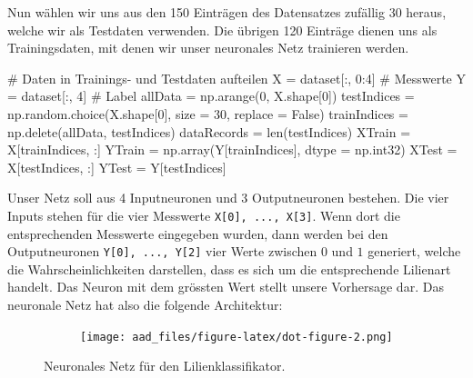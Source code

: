 \documentclass[
  a4paper,
  DIV=11]{scrreprt}
\newenvironment{Shaded}{\begin{snugshade}}{\end{snugshade}}
\newcommand{\BuiltInTok}[1]{\textcolor[rgb]{0.00,0.23,0.31}{#1}}
\newcommand{\CommentTok}[1]{\textcolor[rgb]{0.37,0.37,0.37}{#1}}
\newcommand{\DecValTok}[1]{\textcolor[rgb]{0.68,0.00,0.00}{#1}}
\newcommand{\NormalTok}[1]{\textcolor[rgb]{0.00,0.23,0.31}{#1}}
\newcommand{\OperatorTok}[1]{\textcolor[rgb]{0.37,0.37,0.37}{#1}}
\newcommand{\VariableTok}[1]{\textcolor[rgb]{0.07,0.07,0.07}{#1}}
\theoremstyle{definition}
\theoremstyle{definition}
\theoremstyle{remark}
\begin{document}
Nun wählen wir uns aus den 150 Einträgen des Datensatzes zufällig 30
heraus, welche wir als Testdaten verwenden. Die übrigen 120 Einträge
dienen uns als Trainingsdaten, mit denen wir unser neuronales Netz
trainieren werden.

\begin{Shaded}
\begin{Highlighting}[]
\CommentTok{\# Daten in Trainings{-} und Testdaten aufteilen}
\NormalTok{X }\OperatorTok{=}\NormalTok{ dataset[:, }\DecValTok{0}\NormalTok{:}\DecValTok{4}\NormalTok{] }\CommentTok{\# Messwerte}
\NormalTok{Y }\OperatorTok{=}\NormalTok{ dataset[:, }\DecValTok{4}\NormalTok{]   }\CommentTok{\# Label}
\NormalTok{allData }\OperatorTok{=}\NormalTok{ np.arange(}\DecValTok{0}\NormalTok{, X.shape[}\DecValTok{0}\NormalTok{])}
\NormalTok{testIndices }\OperatorTok{=}\NormalTok{ np.random.choice(X.shape[}\DecValTok{0}\NormalTok{], size }\OperatorTok{=} \DecValTok{30}\NormalTok{, replace }\OperatorTok{=} \VariableTok{False}\NormalTok{)}
\NormalTok{trainIndices }\OperatorTok{=}\NormalTok{ np.delete(allData, testIndices)}
\NormalTok{dataRecords }\OperatorTok{=} \BuiltInTok{len}\NormalTok{(testIndices)}
\NormalTok{XTrain }\OperatorTok{=}\NormalTok{ X[trainIndices, :]}
\NormalTok{YTrain }\OperatorTok{=}\NormalTok{ np.array(Y[trainIndices], dtype }\OperatorTok{=}\NormalTok{ np.int32)}
\NormalTok{XTest }\OperatorTok{=}\NormalTok{ X[testIndices, :]}
\NormalTok{YTest }\OperatorTok{=}\NormalTok{ Y[testIndices]}
\end{Highlighting}
\end{Shaded}

Unser Netz soll aus 4 Inputneuronen und 3 Outputneuronen bestehen. Die
vier Inputs stehen für die vier Messwerte
\texttt{X{[}0{]},\ ...,\ X{[}3{]}}. Wenn dort die entsprechenden
Messwerte eingegeben wurden, dann werden bei den Outputneuronen
\texttt{Y{[}0{]},\ ...,\ Y{[}2{]}} vier Werte zwischen \(0\) und \(1\)
generiert, welche die Wahrscheinlichkeiten darstellen, dass es sich um
die entsprechende Lilienart handelt. Das Neuron mit dem grössten Wert
stellt unsere Vorhersage dar. Das neuronale Netz hat also die folgende
Architektur:

\begin{figure}

{\centering 

\begin{figure}[H]

{\centering \texttt{[image: aad\_files/figure-latex/dot-figure-2.png]}

}

\end{figure}

}

\caption{\label{fig-FisherNNArchitecture}Neuronales Netz für den
Lilienklassifikator.}

\end{figure}
\end{document}
